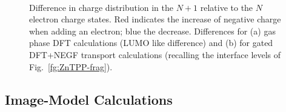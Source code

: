 \documentclass[aip,jcp,a4paper,reprint,floatfix,superscriptaddress]{revtex4-1}
\begin{document}
\begin{figure}
 \\
\caption{Difference in charge distribution in the $N+1$ relative to the $N$ electron charge states. Red indicates the increase of negative charge when adding an electron; blue the decrease. Differences for (a) gas phase DFT calculations (LUMO like difference) and (b) for gated DFT+NEGF transport calculations (recalling the interface levels of Fig.~\ref{fg:ZnTPP-frag}).} \label{fg:NNpm1-charges}
\end{figure}







\subsection{Image-Model Calculations}\label{imagemodelcalcs}
\end{document}
